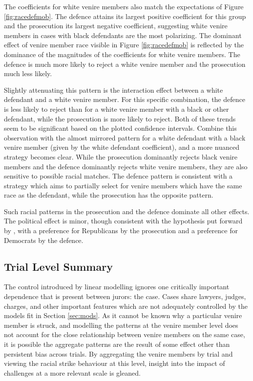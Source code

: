 The coefficients for white venire members also match the expectations of Figure \ref{fig:racedefmob}. The defence attains its
largest positive coefficient for this group and the prosecution its largest negative coefficient, suggesting white venire members in cases with black defendants are the most polarizing. The dominant effect of venire member
race visible in Figure \ref{fig:racedefmob} is reflected by the dominance of the
magnitudes of the coefficients for white venire members. The defence is much more
likely to reject a white venire member and the prosecution much less likely.

Slightly attenuating this pattern is the interaction effect between a white defendant and a white venire member. For this specific
combination, the defence is less likely to reject than for a white venire member with a black or other defendant, while the
prosecution is more likely to reject. Both of these trends seem to be significant based on the plotted confidence
intervals. Combine this observation with the almost mirrored pattern for a white defendant with a black venire member (given by
the white defendant coefficient), and a more nuanced strategy becomes clear. While the prosecution dominantly rejects black venire
members and the defence dominantly rejects white venire members, they are also sensitive to possible racial matches. The defence
pattern is consistent with a strategy which aims to partially select for venire members which have the same race as the defendant,
while the prosecution has the opposite pattern.

Such racial patterns in the prosecution and the defence dominate all other effects. The political effect is minor, though
consistent with the hypothesis put forward by \cite{revesz2016}, with a preference for Republicans by the prosecution and a
preference for Democrats by the defence.

\subsection{Trial Level Summary} \label{sec:casesum}

The control introduced by linear modelling ignores one critically important dependence that is present between jurors: the case. Cases share lawyers, judges, charges, and other important features which are not adequately controlled by the models fit in Section \ref{sec:mods}.  As it cannot be known why a particular venire member is struck, and modelling the patterns at the venire member level does not account for the close relationship between venire members on the same case, it is possible the aggregate patterns are the result
of some effect other than persistent bias across trials. By aggregating the venire members by trial and viewing the racial strike behaviour at this level, insight into the impact of challenges at a more relevant scale is gleaned.

